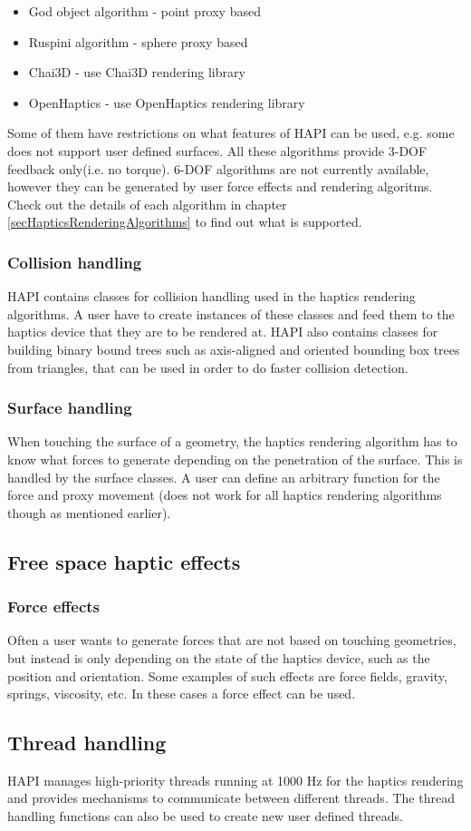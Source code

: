 \begin{itemize}
\item God object algorithm - point proxy based
\item Ruspini algorithm - sphere proxy based
\item Chai3D - use Chai3D rendering library
\item OpenHaptics - use OpenHaptics rendering library
\end{itemize}

Some of them have restrictions on what features of HAPI can be used, e.g. some does not support user defined surfaces. All these algorithms provide 3-DOF feedback only(i.e. no torque). 6-DOF algorithms are not currently available, however they can be generated by user force effects and rendering algoritms. Check out the details of each algorithm in chapter \ref{secHapticsRenderingAlgorithms} to find out what is supported.

\subsubsection{Collision handling}
HAPI contains classes for collision handling used in the
haptics rendering algorithms. A user have to create instances of these
classes and feed them to the haptics device that they are to be
rendered at. HAPI also contains classes for building binary bound trees
such as axis-aligned and oriented bounding box trees from triangles,
that can be used in order to do faster collision detection. 

\subsubsection{Surface handling}
When touching the surface of a geometry, the haptics rendering
algorithm has to know what forces to generate depending on the
penetration of the surface. This is handled by the surface classes. A
user can define an arbitrary function for the force and proxy
movement (does not work for all haptics rendering algorithms though as
mentioned earlier).

\subsection{Free space haptic effects}

\subsubsection{Force effects}
Often a user wants to generate forces that are not based on
touching geometries, but instead is only depending on the state of the haptics device, such as the position and orientation. Some examples of such effects are force fields, gravity, springs, viscosity, etc. In these cases a force effect can be used.

\subsection{Thread handling}
HAPI manages high-priority threads running at 1000 Hz for the haptics
rendering and provides mechanisms to communicate between different
threads. The thread handling functions can also be used to create new
user defined threads.
